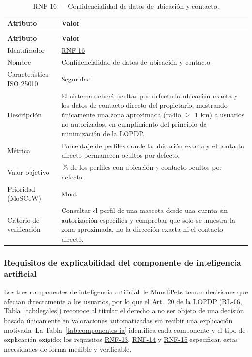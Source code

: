 \documentclass[journal,onecolumn]{IEEEtran}
\makeatletter
\newenvironment{atributos}[2]{%
	\small
	\begin{longtable}{@{}>{\raggedright\arraybackslash}p{4.2cm} >{\raggedright\arraybackslash}p{11.2cm}@{}}
		\caption{#2}\label{tab:#1}\\
		\toprule
		\textbf{Atributo} & \textbf{Valor} \\
		\midrule
		\endfirsthead
		\multicolumn{2}{@{}l}{\small\itshape (continuación)}\\
		\toprule
		\textbf{Atributo} & \textbf{Valor} \\
		\midrule
		\endhead
		\bottomrule
		\endlastfoot
	}{%
	\end{longtable}
	\normalsize
}
\makeatother
\begin{document}
	\begin{atributos}{RNF-16}{RNF-16 --- Confidencialidad de datos de ubicación y contacto.}
		Identificador & \hyperref[tab:RNF-16]{RNF-16} \\
		Nombre & Confidencialidad de datos de ubicación y contacto \\
		Característica ISO 25010 & Seguridad \\
		Descripción & El sistema deberá ocultar por defecto la ubicación exacta y los datos de contacto directo del propietario, mostrando únicamente una zona aproximada (radio $\geq$ 1 km) a usuarios no autorizados, en cumplimiento del principio de minimización de la LOPDP. \\
		Métrica & Porcentaje de perfiles donde la ubicación exacta y el contacto directo permanecen ocultos por defecto. \\
		Valor objetivo & 100\,\% de los perfiles con ubicación y contacto ocultos por defecto. \\
		Prioridad (MoSCoW) & Must \\
		Criterio de verificación & Consultar el perfil de una mascota desde una cuenta sin autorización específica y comprobar que solo se muestra la zona aproximada, no la dirección exacta ni el contacto directo. \\
	\end{atributos}
	
	\subsubsection{Requisitos de explicabilidad del componente de inteligencia artificial}
	\label{sec:explicabilidad}
	
	Los tres componentes de inteligencia artificial de MundiPets toman decisiones
	que afectan directamente a los usuarios, por lo que el Art.~20 de la LOPDP
	(\hyperref[rl:06]{RL-06}, Tabla~\ref{tab:legales}) reconoce al titular el derecho a no ser objeto
	de una decisión basada únicamente en valoraciones automatizadas sin recibir una
	explicación motivada. La Tabla~\ref{tab:componentes-ia} identifica cada
	componente y el tipo de explicación exigido; los requisitos \hyperref[tab:RNF-13]{RNF-13}, \hyperref[tab:RNF-14]{RNF-14} y
	\hyperref[tab:RNF-15]{RNF-15} especifican estas necesidades de forma medible y verificable.
	
\end{document}
